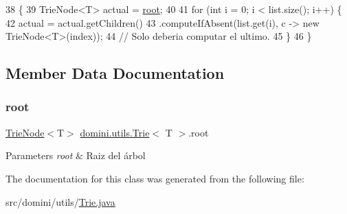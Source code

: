 \begin{DoxyCode}
38                                                          \{
39         TrieNode<T> actual = \hyperlink{classdomini_1_1utils_1_1Trie_a60ef63a6c55d07710d33892ccc899bce}{root};
40 
41         \textcolor{keywordflow}{for} (\textcolor{keywordtype}{int} i = 0; i < list.size(); i++) \{
42             actual = actual.getChildren()
43                 .computeIfAbsent(list.get(i), c -> \textcolor{keyword}{new} TrieNode<T>(index)); 
44                 \textcolor{comment}{// Solo deberia computar el ultimo.}
45         \}
46     \}
\end{DoxyCode}


\subsection{Member Data Documentation}
\mbox{\label{classdomini_1_1utils_1_1Trie_a60ef63a6c55d07710d33892ccc899bce}} 
\subsubsection{\texorpdfstring{root}{root}}
{\footnotesize\ttfamily \hyperlink{classdomini_1_1utils_1_1TrieNode}{Trie\+Node}$<$T$>$ \hyperlink{classdomini_1_1utils_1_1Trie}{domini.\+utils.\+Trie}$<$ T $>$.root\hspace{0.3cm}{\ttfamily [private]}}


\begin{DoxyParams}{Parameters}
{\em root} & Raiz del árbol \\
\hline
\end{DoxyParams}


The documentation for this class was generated from the following file\+:\begin{DoxyCompactItemize}
\item 
src/domini/utils/\hyperlink{Trie_8java}{Trie.\+java}\end{DoxyCompactItemize}

